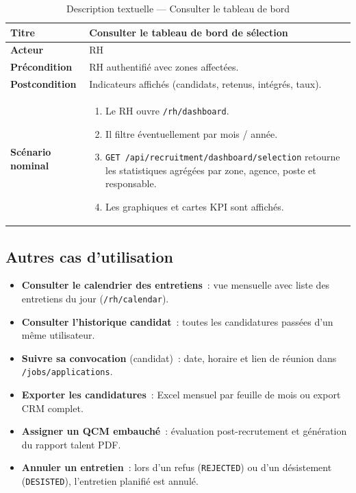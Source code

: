 \begin{table}[htbp]
  \centering
  \small
  \caption{Description textuelle --- Consulter le tableau de bord}
  \label{tab:uc-dashboard}
  \begin{tabular}{|p{3.0cm}|p{10.2cm}|}
    \hline
    \textbf{Titre} & Consulter le tableau de bord de sélection \\
    \hline
    \textbf{Acteur} & RH \\
    \hline
    \textbf{Précondition} & RH authentifié avec zones affectées. \\
    \hline
    \textbf{Postcondition} & Indicateurs affichés (candidats, retenus, intégrés, taux). \\
    \hline
    \textbf{Scénario nominal}
    &
    \begin{enumerate}[leftmargin=*,itemsep=0.15em,topsep=0.2em]
      \item Le RH ouvre \texttt{/rh/dashboard}.
      \item Il filtre éventuellement par mois / année.
      \item \texttt{GET /api/recruitment/dashboard/selection} retourne les statistiques
            agrégées par zone, agence, poste et responsable.
      \item Les graphiques et cartes KPI sont affichés.
    \end{enumerate}
    \\
    \hline
  \end{tabular}
\end{table}


\subsection{Autres cas d'utilisation}

\begin{itemize}
  \item \textbf{Consulter le calendrier des entretiens}~: vue mensuelle avec
        liste des entretiens du jour (\texttt{/rh/calendar}).
  \item \textbf{Consulter l'historique candidat}~: toutes les candidatures
        passées d'un même utilisateur.
  \item \textbf{Suivre sa convocation} (candidat)~: date, horaire et lien de
        réunion dans \texttt{/jobs/applications}.
  \item \textbf{Exporter les candidatures}~: Excel mensuel par feuille de mois
        ou export CRM complet.
  \item \textbf{Assigner un QCM embauché}~: évaluation post-recrutement et
        génération du rapport talent PDF.
  \item \textbf{Annuler un entretien}~: lors d'un refus (\texttt{REJECTED}) ou
        d'un désistement (\texttt{DESISTED}), l'entretien planifié est annulé.
\end{itemize}


